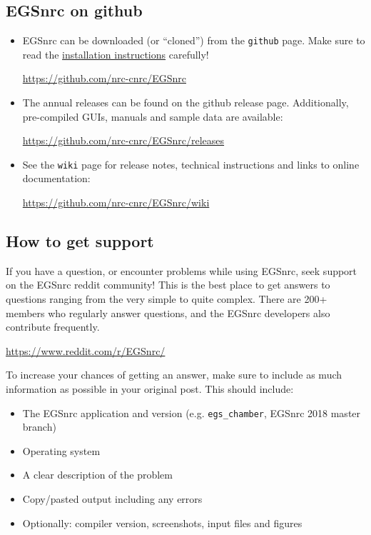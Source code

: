 \documentclass[12pt,twoside]{article}
\begin{document}
\subsection{EGSnrc on github}

\begin{itemize}
\item EGSnrc can be downloaded (or ``cloned'') from the \Verb+github+ page. Make sure
to read the \href{https://github.com/nrc-cnrc/EGSnrc/wiki/Installation-overview}{installation instructions} carefully!

\href{https://github.com/nrc-cnrc/EGSnrc}{https://github.com/nrc-cnrc/EGSnrc}

\item The annual releases can be found on the github release page. Additionally,
pre-compiled GUIs, manuals and sample data are available:

\href{https://github.com/nrc-cnrc/EGSnrc/releases}{https://github.com/nrc-cnrc/EGSnrc/releases}

\item See the \Verb+wiki+ page for release notes, technical instructions and links to online documentation:

\href{https://github.com/nrc-cnrc/EGSnrc/wiki}{https://github.com/nrc-cnrc/EGSnrc/wiki}
\end{itemize}

\subsection{How to get support}
If you have a question, or encounter problems while using EGSnrc,
seek support on the EGSnrc reddit community! This is the best place
to get answers to questions ranging from the very simple to quite
complex. There are 200+ members who regularly answer questions, and
the EGSnrc developers also contribute frequently.

\href{https://www.reddit.com/r/EGSnrc/}{https://www.reddit.com/r/EGSnrc/}

To increase your chances of getting an answer, make sure to include as much information as possible in your original post. This should include:
\begin{itemize}
\item The EGSnrc application and version (e.g. \Verb+egs_chamber+, EGSnrc 2018 master branch)
\item Operating system
\item A clear description of the problem
\item Copy/pasted output including any errors
\item Optionally: compiler version, screenshots, input files and figures
\end{itemize}
\end{document}
